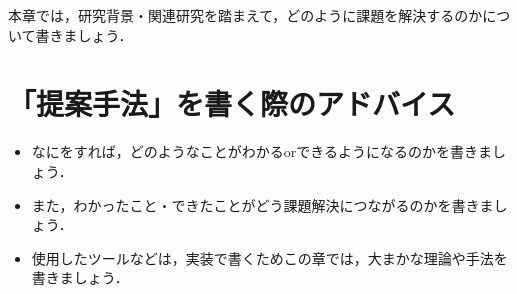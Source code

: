 本章では，研究背景・関連研究を踏まえて，どのように課題を解決するのかについて書きましょう．

\section{「提案手法」を書く際のアドバイス}
\begin{itemize}
    \item なにをすれば，どのようなことがわかるorできるようになるのかを書きましょう．
    \item また，わかったこと・できたことがどう課題解決につながるのかを書きましょう．
    \item 使用したツールなどは，実装で書くためこの章では，大まかな理論や手法を書きましょう．
\end{itemize}